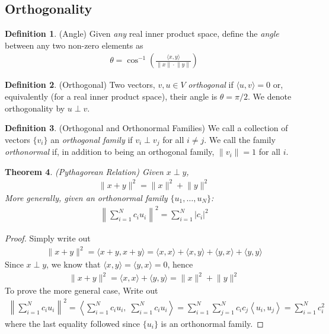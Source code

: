 \documentclass[12pt]{article}
\numberwithin{equation}{section} %
\theoremstyle{plain}
\newtheorem{thm}{Theorem}[section]
\theoremstyle{definition}
\newtheorem{defn}[thm]{Definition}
\theoremstyle{remark}
\begin{document}
\clearpage
\subsection{Orthogonality}

\begin{defn}(Angle)
Given \emph{any} real inner product space, define the \emph{angle}
between any two non-zero elements as
\begin{align*}
  \theta = \cos^{-1}\left(
  \frac{\langle x,y \rangle}{\lVert x\rVert \cdot \lVert y \rVert}
  \right)
\end{align*}
\end{defn}

\begin{defn}(Orthogonal)
Two vectors, $v,u\in V$ \emph{orthogonal} if $\langle u,v\rangle=0$ or,
equivalently (for a real inner product space), their angle is
$\theta=\pi/2$. We denote orthogonality by $u\perp v$.
\end{defn}

\begin{defn}(Orthogonal and Orthonormal Families)
We call a collection of vectors $\{v_i\}$ an \emph{orthogonal family} if
$v_i\perp v_j$ for all $i\neq j$. We call the family \emph{orthonormal}
if, in addition to being an orthogonal family, $\lVert v_i\rVert=1$ for
all $i$.
\end{defn}

\begin{thm}
\label{pythag}
\emph{(Pythagorean Relation)} Given $x\perp y$,
\begin{align*}
    \lVert x + y\rVert^2 = \lVert x\rVert^2 + \lVert y \rVert^2
\end{align*}
More generally, given an orthonormal family $\{u_1,\ldots,u_N\}$:
\begin{align*}
  \left\lVert \sum_{i=1}^N c_i u_i \right\rVert^2
  = \sum_{i=1}^N |c_i|^2
\end{align*}
\end{thm}
\begin{proof}
Simply write out
\begin{align*}
  \lVert x + y\rVert^2 =
  \langle x + y, x + y\rangle
  =
  \langle x , x \rangle
  +
  \langle x , y \rangle
  +
  \langle y , x \rangle
  +
  \langle y , y \rangle
\end{align*}
Since $x\perp y$, we know that $\langle x,y \rangle = \langle y,x
\rangle =0$, hence
\begin{align*}
  \lVert x + y\rVert^2 =
  \langle x , x \rangle
  +
  \langle y , y \rangle
  =
  \lVert x\rVert^2 + \lVert y\rVert^2
\end{align*}
To prove the more general case, Write out
\begin{align*}
  \left\lVert \sum_{i=1}^N c_i u_i \right\rVert^2
  =
  \left\langle
  \sum_{i=1}^N c_i u_i,\;
  \sum_{i=1}^N c_i u_i
  \right\rangle
  =
  \sum_{i=1}^N
  \sum_{j=1}^N
  c_ic_j
  \left\langle
  u_i, u_j
  \right\rangle
  =
  \sum_{i=1}^N
  c_i^2
\end{align*}
where the last equality followed since $\{u_i\}$ is an orthonormal
family.
\end{proof}
\end{document}
